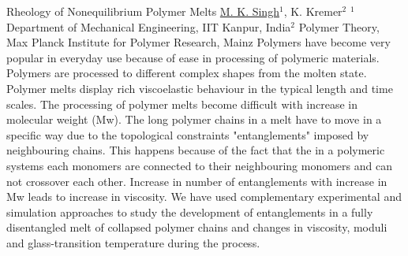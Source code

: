 
    \begin{abstract_online}{Rheology of Nonequilibrium Polymer Melts}{%
        \underline{M. K. Singh}$^{1}$, K. Kremer$^{2}$}{%
        \IStag}{%
        $^1$ Department of Mechanical Engineering, IIT Kanpur, India\newline{}$^2$ Polymer Theory, Max Planck Institute for Polymer Research, Mainz}
    Polymers have become very popular in everyday use because of ease in processing of polymeric materials. Polymers are processed to different complex shapes from the molten state. Polymer melts display rich viscoelastic behaviour in the typical length and time scales. The processing of polymer melts become difficult with increase in molecular weight (Mw). The long polymer chains in a melt have to move in a specific way due to the topological constraints "entanglements" imposed by neighbouring chains. This happens because of the fact that the in a polymeric systems each monomers are connected to their neighbouring monomers and can not crossover each other. Increase in number of entanglements with increase in Mw leads to increase in viscosity. We have used complementary experimental and simulation approaches to study the development of entanglements in a fully disentangled melt of collapsed polymer chains and changes in viscosity, moduli and glass-transition temperature during the process.  
    
    \end{abstract_online}
    